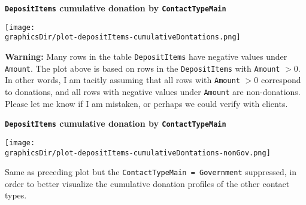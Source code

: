 \begin{frame}{\large\bf \texttt{DepositItems} cumulative donation by \texttt{ContactTypeMain}}
\tiny
\vskip 0.8cm
\begin{center}
\texttt{[image: \\graphicsDir/plot-depositItems-cumulativeDontations.png]}
\end{center}

\begin{flushleft}
\textbf{\color{red}Warning:}\;\;
Many rows in the table \texttt{DepositItems} have negative values under \texttt{Amount}.
The plot above is based on rows in the \texttt{DepositItems} with \texttt{Amount} $> 0$.
In other words, I am tacitly assuming that all rows with \texttt{Amount} $>0$ correspond to donations, and all
rows with negative values under \texttt{Amount} are non-donations.
Please let me know if I am mistaken, or perhaps we could verify with clients.
\end{flushleft}

\end{frame}
\normalsize

\begin{frame}{\large\bf \texttt{DepositItems} cumulative donation by \texttt{ContactTypeMain}}
\tiny

\vskip 0.8cm
\begin{center}
\texttt{[image: \\graphicsDir/plot-depositItems-cumulativeDontations-nonGov.png]}
\end{center}

\begin{flushleft}
Same as preceding plot but the \;\texttt{ContactTypeMain = Government}\; suppressed,
in order to better visualize the cumulative donation profiles of the other contact types.
\vskip 0.5cm
\mbox{}
\end{flushleft}
\end{frame}
\normalsize

